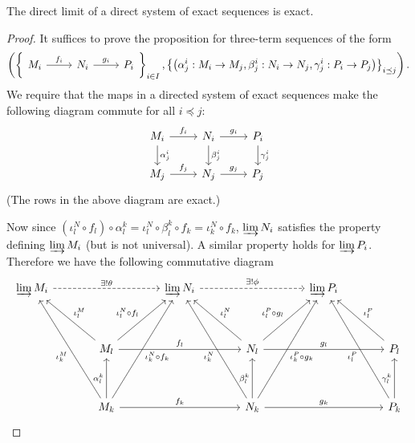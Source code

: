 \begin{prop}[1.15]
	The direct limit of a direct system of exact sequences is exact.
\end{prop}

\begin{proof}
	It suffices to prove the proposition for three-term sequences of the form
	\[\left(\left\{
	\begin{tikzcd}
		M_i \ar[r, "f_i"] & N_i \ar[r, "g_i"] & P_i
	\end{tikzcd}
	\right\}_{i \in I},
	\left\{\left(\alpha^i_j: M_i \to M_j,\beta^i_j: N_i \to N_j,\gamma^i_j: P_i \to P_j\right)\right\}_{i \preceq j}\right).\]	
	We require that the maps in a directed system of exact sequences make the following diagram commute for all $i \preceq j$:
	\[\begin{tikzcd}
		M_i \ar[r, "f_i"] \ar[d, "\alpha^i_j"] & N_i \ar[r, "g_i"] \ar[d, "\beta^i_j"] & P_i \ar[d, "\gamma^i_j"] \\
		M_j \ar[r, "f_j"] & N_j \ar[r, "g_j"] & P_j
	\end{tikzcd}\]
	(The rows in the above diagram are exact.)
	
	Now since $(\iota_l^N \circ f_l) \circ \alpha_l^k = \iota_l^N \circ \beta_l^k \circ f_k = \iota_k^N \circ f_k$, $\varinjlim N_i$ satisfies the property defining $\varinjlim M_i$ (but is not universal).
	A similar property holds for $\varinjlim P_i$.
	Therefore we have the following commutative diagram
	\[\begin{tikzcd}[row sep=huge, column sep=large]
	\varinjlim M_i \arrow[rr, "\exists !\theta", dashed] & & \varinjlim N_i \arrow[rr, "\exists !\phi", dashed] & & \varinjlim P_i & \\
	& M_l \arrow[lu, "\iota_l^M"'] \arrow[ru, "\iota_l^N \circ f_l"] \arrow[rr, "f_l"] & & N_l \arrow[lu, "\iota_l^N"'] \arrow[ru, "\iota_l^P \circ g_l"] \arrow[rr, "g_l"] & & P_l \arrow[ul, "\iota_l^P"'] \\
	& M_k \arrow[luu, "\iota_k^M"] \arrow[ruu, swap, "\iota_k^N\circ f_k"] \arrow[u, "\alpha_l^k"] \arrow[rr, "f_k"] & & N_k \arrow[luu, "\iota_k^N"] \arrow[ruu, swap, "\iota_k^P\circ g_k"] \arrow[u, "\beta_l^k"] \arrow[rr, "g_k"] & & P_k \arrow[u, "\gamma_l^k"] \arrow[uul, "\iota_l^P"]
	\end{tikzcd}\]
	

\end{proof}
